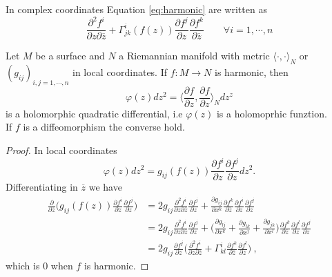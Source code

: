 In complex coordinates Equation \ref{eq:harmonic} are written as
\[
\frac{\partial^2 f^i}{\partial z \partial \overline{z}} + \Gamma^i_{jk} (f(z)) \frac{\partial f^j}{\partial z} \frac{\partial f^k}{\partial \overline{z}} \qquad \forall i = 1, \cdots, n
\]

\begin{theorem}
    Let $M$ be a surface and $N$ a Riemannian manifold with metric $\langle \cdot,\cdot \rangle_N$ or $(g_{ij})_{i,j = 1, \cdots , n}$ in local coordinates. If $f:M \to N$ is harmonic, then 
    \[
        \varphi(z) dz^2 = \Big\langle \frac{\partial f}{\partial z},  \frac{\partial f}{\partial z} \Big\rangle_N dz^z
    \]
    is a holomorphic quadratic differential, i.e $\varphi(z)$ is a holomoprhic funztion. \\
    If $f$ is a diffeomorphism the converse hold.
\end{theorem}
\begin{proof}
    In local coordinates
    \[
        \varphi(z)dz^2 = g_{ij}(f(z)) \frac{\partial f^i}{\partial z}  \frac{\partial f^j}{\partial z} dz^2. 
    \]
    Differentiating in $\overline{z}$ we have
    \[
    \begin{split}
       \frac{ \partial}{\partial \overline{z}} \Big(g_{ij}(f(z)) \frac{\partial f^i}{\partial z}  \frac{\partial f^j}{\partial z} \Big) & = 2 g_{ij} \frac{\partial^2 f^i}{\partial z \partial \overline{z}} \frac{\partial f^j}{\partial z} + \frac{\partial g_{ij}}{\partial x^k} \frac{\partial f^k}{\partial \overline{z}} \frac{\partial f^i}{\partial z} \frac{\partial f^j}{\partial z} \\
       & = 2 g_{ij} \frac{\partial^2 f^i}{\partial z \partial \overline{z}} \frac{\partial f^j}{\partial z} + \Big(\frac{\partial g_{lj}}{\partial x^k} + \frac{\partial g_{lk}}{\partial x^j} + \frac{\partial g_{jk}}{\partial x^l} \Big) \frac{\partial f^k}{\partial \overline{z}} \frac{\partial f^l}{\partial z} \frac{\partial f^j}{\partial z}  \\
       & = 2 g_{ij} \frac{\partial f^j}{\partial z} \Big( \frac{\partial^2 f^i}{\partial z \partial \overline{z}} + \Gamma^i_{kl}  \frac{\partial f^k}{\partial \overline{z}} \frac{\partial f^l}{\partial z} \Big) \ ,
    \end{split}
    \]
    which is $0$ when $f$ is harmonic.
\end{proof}

